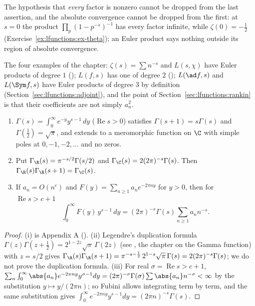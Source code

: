 The hypothesis that \emph{every} factor is nonzero cannot be dropped from the last assertion, and the absolute convergence cannot be dropped from the first: at $s=0$ the
product $\prod_p(1-p^{-s})^{-1}$ has every factor infinite, while $\zeta(0)=-\frac12$ (Exercise~\ref{ex:lfunctions:ex-theta}); an Euler product says nothing outside its region of
absolute convergence.

The four examples of the chapter: $\zeta(s)=\sum n^{-s}$ and $L(s,\chi)$ have Euler products of degree $1$ ();
$L(f,s)$ has one of degree $2$ (); $L(\ad f,s)$ and $L(\Sym f,s)$ have Euler products of degree $3$ by definition (Section~\ref{sec:lfunctions:adjoint}),
and the point of Section~\ref{sec:lfunctions:rankin} is that their coefficients are not simply $a_n^2$.

\begin{lemma}\label{lem:lfunctions:mellin}
\begin{enumerate}[label=(\roman*)]
\item $\Gamma(s)=\int_0^\infty e^{-y}y^{s-1}\,dy$ ($\operatorname{Re}s>0$) satisfies $\Gamma(s+1)=s\Gamma(s)$ and $\Gamma(\frac12)=\sqrt\pi$, and extends to a meromorphic function on $\C$ with
simple poles at $0,-1,-2,\dots$ and no zeros.
\item Put $\Gamma_\R(s)=\pi^{-s/2}\Gamma(s/2)$ and $\Gamma_\C(s)=2(2\pi)^{-s}\Gamma(s)$. Then $\Gamma_\R(s)\Gamma_\R(s+1)=\Gamma_\C(s)$.
\item If $a_n=O(n^c)$ and $F(y)=\sum_{n\ge1}a_ne^{-2\pi ny}$ for $y>0$, then for $\operatorname{Re}s>c+1$
\[
\int_0^\infty F(y)\,y^{s-1}\,dy=(2\pi)^{-s}\Gamma(s)\sum_{n\ge1}a_nn^{-s}.
\]
\end{enumerate}
\end{lemma}

\begin{proof}
(i) is Appendix A (). (ii) Legendre's duplication formula $\Gamma(z)\Gamma(z+\frac12)=2^{1-2z}\sqrt\pi\,\Gamma(2z)$ (see \cite{Davenport00}, the chapter on the Gamma function) with $z=s/2$ gives
$\Gamma_\R(s)\Gamma_\R(s+1)=\pi^{-s-\frac12}\,2^{1-s}\sqrt\pi\,\Gamma(s)=2(2\pi)^{-s}\Gamma(s)$; we do not prove the duplication formula. (iii) For real $\sigma=\operatorname{Re}s>c+1$,
$\sum_n\int_0^\infty\abs{a_n}e^{-2\pi ny}y^{\sigma-1}dy=(2\pi)^{-\sigma}\Gamma(\sigma)\sum\abs{a_n}n^{-\sigma}<\infty$ by the substitution $y\mapsto y/(2\pi n)$; so Fubini allows integrating
term by term, and the same substitution gives $\int_0^\infty e^{-2\pi ny}y^{s-1}dy=(2\pi n)^{-s}\Gamma(s)$.
\end{proof}

